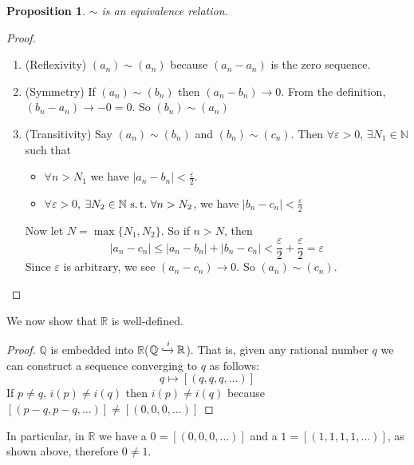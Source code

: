\documentclass[12pt]{amsart}
\newcommand{\bbR}{\mathbb{R}}
\newcommand{\bbN}{\mathbb{N}}
\newcommand{\bbQ}{\mathbb{Q}}
\newcommand{\suchthat}{\operatorname{\thinspace s.t. \thinspace}}
\theoremstyle{plain}
\newtheorem*{prop}{Proposition}
\theoremstyle{remark}
\theoremstyle{definition}
\begin{document}
\begin{prop}
	$\sim$ is an equivalence relation.
\end{prop}
\begin{proof}
\hfill
\newline
	\begin{enumerate}
		\item (Reflexivity)
			$(a_n) \sim (a_n)$ because $(a_n - a_n)$ is the zero sequence.
		\item (Symmetry)
		If $(a_n) \sim (b_n)$ then $(a_n - b_n) \rightarrow 0$. From the definition, $(b_n - a_n) \rightarrow -0 = 0$. So $(b_n)\sim (a_n)$
		\item (Transitivity)
			Say $(a_n) \sim (b_n)$ and $(b_n) \sim (c_n)$. Then $\forall \varepsilon > 0$, $ \exists N_1 \in \bbN $ such that
			\begin{itemize}[-]
				\item 
					$\forall n > N_1$ we have $|a_n - b_n| < \frac{\varepsilon}{2}$.
				\item
					$\forall \varepsilon > 0$, $\exists N_2 \in \bbN \suchthat \forall n > N_2$, we have $|b_n - c_n| < \frac{\varepsilon}{2}$
			\end{itemize}
			Now let $N = \max\{N_1, N_2\}$. So if $n > N$, then 
			\begin{equation*}
				|a_n - c_n| \leqslant |a_n - b_n| + |b_n - c_n| < \frac{\varepsilon}{2} + \frac{\varepsilon}{2} = \varepsilon
			\end{equation*}
			Since $\varepsilon$ is arbitrary, we see $(a_n - c_n) \rightarrow 0$. So $(a_n) \sim (c_n)$.
	\end{enumerate}
\end{proof}

\par
We now show that $\bbR$ is well-defined.
\begin{proof}
		$\bbQ$ is embedded into $\bbR$($\bbQ \xhookrightarrow[]{\thinspace i\thinspace} \bbR$). That is, given any rational number $q$ we can construct a sequence converging to $q$ as follows:
		\begin{equation*}
			q \mapsto [(q,q,q,\dots)]
		\end{equation*}
		If $p \neq q$, $i(p) \neq i(q)$ then $i(p) \neq i(q)$ because $[(p - q, p - q,\dots)] \neq [(0,0,0,\dots)]$
\end{proof}

In particular, in $\bbR$ we have a $0 = [(0,0,0,\dots)]$ and a $1 = [(1,1,1,1,\dots)]$, as shown above, therefore $0 \neq 1$.
\end{document}
